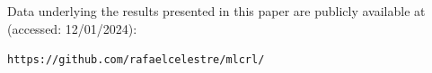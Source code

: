 \documentclass[preprint]{iucr}
\begin{document}







Data underlying the results presented in this paper are publicly available at (accessed: 12/01/2024):
\begin{center}
\small{\texttt{https://github.com/rafaelcelestre/mlcrl/}}
\end{center}


\end{document}
